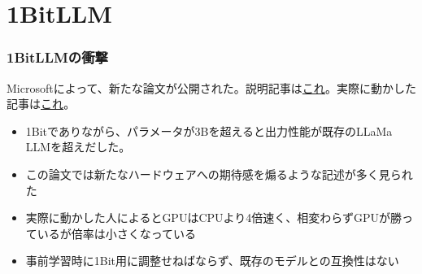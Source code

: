 \documentclass[dvipdfmx,12pt]{beamer}%
\begin{document}
\section{1BitLLM}
\begin{frame}
\frametitle{1BitLLMの衝撃}
Microsoftによって、新たな論文が公開された。説明記事は\href{https://wirelesswire.jp/2024/02/86094/}{これ}。実際に動かした記事は\href{https://note.com/shi3zblog/n/n58b0a2252727}{これ}。
\begin{itemize}
\item 1Bitでありながら、パラメータが3Bを超えると出力性能が既存のLLaMa LLMを超えだした。
\item この論文では新たなハードウェアへの期待感を煽るような記述が多く見られた
\item 実際に動かした人によるとGPUはCPUより4倍速く、相変わらずGPUが勝っているが倍率は小さくなっている
\item 事前学習時に1Bit用に調整せねばならず、既存のモデルとの互換性はない
\end{itemize}
\end{frame}

\end{document}
